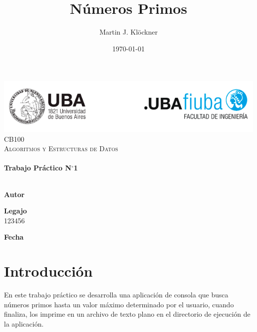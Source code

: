 \documentclass[12pt]{article}
\title{Números Primos}          %
\author{Martin J. Klöckner}     %
\date{\today}                   %
\makeatletter
\newcommand{\padron}{123456}    %
\newcommand{\tpnumber}{1}       %
\let\thetitle\@title
\let\theauthor\@author
\let\thedate\@date
\makeatother
\begin{document}
\begin{titlepage}
    \vspace*{-2.5cm}
    {\centering
    \includegraphics[width=1.00\textwidth]{img/logofiuba.png}\\[2.25 cm]}
    \centering
    \textsc{\Large CB100}\\[0.2 cm]
    \textsc{\large Algoritmos y Estructuras de Datos}\\[4 cm]
    \textcolor{cyan}{{\fontsize{40}{60}\selectfont \bfseries \thetitle}}\\[0.5cm]
    {\Large \bfseries Trabajo Práctico N$^\circ$\tpnumber}\\[5cm]


    \vfill
    \noindent\makebox[\linewidth]{\rule{\textwidth}{0.4pt}}\\[0.5cm]
    \begin{minipage}{.46\textwidth}
    \textbf{Autor}\\
    \theauthor
    \end{minipage}%
    \begin{minipage}{.34\textwidth}
    \textbf{Legajo}\\
    \padron
    \end{minipage}%
    \begin{minipage}{.2\textwidth}
     \begin{flushright}
        \textbf{Fecha}\\
        \thedate
    \end{flushright}
    \end{minipage}
\end{titlepage}

{
    \hypersetup{linkcolor=black} %
    \tableofcontents
    \pagebreak
}

\section{Introducción}

En este trabajo práctico se desarrolla una aplicación de consola que busca
números primos hasta un valor máximo determinado por el usuario, cuando
finaliza, los imprime en un archivo de texto plano en el directorio de ejecución
de la aplicación.
\end{document}
